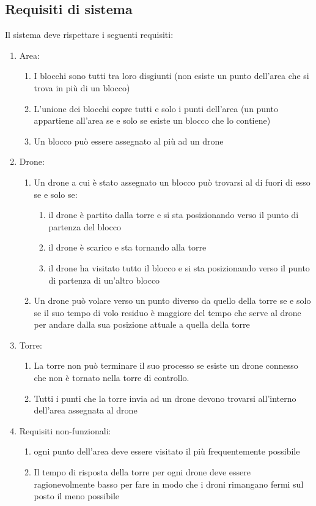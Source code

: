 \documentclass[a4paper, 11pt]{article}
\begin{document}
\subsection{Requisiti di sistema}
Il sistema deve rispettare i seguenti requisiti:
\begin{enumerate}
    \item Area:
    \begin{enumerate}[label=1.\arabic*]
        \item I blocchi sono tutti tra loro disgiunti (non esiste un punto dell'area che si trova in più di un blocco)
        \item L'unione dei blocchi copre tutti e solo i punti dell'area (un punto appartiene all'area se e solo se esiste un blocco che lo contiene)
        \item Un blocco può essere assegnato al più ad un drone 
    \end{enumerate}
    \item Drone:
    \begin{enumerate}[label=1.\arabic*]
        \item Un drone a cui è stato assegnato un blocco può trovarsi al di fuori di esso se e solo se:
        \begin{enumerate}
            \item il drone è partito dalla torre e si sta posizionando verso il punto di partenza del blocco
            \item il drone è scarico e sta tornando alla torre
            \item il drone ha visitato tutto il blocco e si sta posizionando verso il punto di partenza di un'altro blocco
        \end{enumerate}
        \item Un drone può volare verso un punto diverso da quello della torre se e solo se il suo tempo di volo residuo è maggiore del tempo che serve al drone per andare dalla sua posizione attuale a quella della torre
    \end{enumerate}
    \item Torre:
    \begin{enumerate}[label=1.\arabic*]
        \item La torre non può terminare il suo processo se esiste un drone connesso che non è tornato nella torre di controllo.
        \item Tutti i punti che la torre invia ad un drone devono trovarsi all'interno dell'area assegnata al drone
    \end{enumerate}
    \item Requisiti non-funzionali:
    \begin{enumerate}[label=1.\arabic*]
        \item ogni punto dell'area deve essere visitato il più frequentemente possibile
        \item Il tempo di risposta della torre per ogni drone deve essere ragionevolmente basso per fare in modo che i droni rimangano fermi sul posto il meno possibile
    \end{enumerate} 
\end{enumerate}
\newpage
\end{document}
